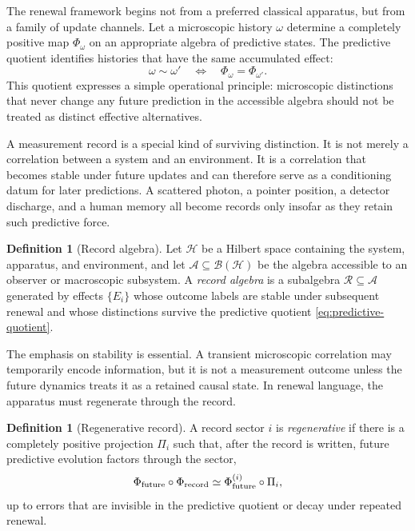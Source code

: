 \documentclass[11pt]{article}
\numberwithin{equation}{section}
\theoremstyle{definition}
\newtheorem{definition}[theorem]{Definition}
\theoremstyle{remark}
\newcommand{\Hilb}{\mathcal H}
\newcommand{\B}{\mathcal B}
\newcommand{\Aalg}{\mathcal A}
\newcommand{\Ralg}{\mathcal R}
\begin{document}
The renewal framework begins not from a preferred classical apparatus, but from a family of update channels.  Let a microscopic history \(\omega\) determine a completely positive map \(\Phi_\omega\) on an appropriate algebra of predictive states.  The predictive quotient identifies histories that have the same accumulated effect:
\begin{equation}
\label{eq:predictive-quotient}
  \omega\sim\omega'
  \quad\Longleftrightarrow\quad
  \Phi_\omega=\Phi_{\omega'} .
\end{equation}
This quotient expresses a simple operational principle: microscopic distinctions that never change any future prediction in the accessible algebra should not be treated as distinct effective alternatives.

A measurement record is a special kind of surviving distinction.  It is not merely a correlation between a system and an environment.  It is a correlation that becomes stable under future updates and can therefore serve as a conditioning datum for later predictions.  A scattered photon, a pointer position, a detector discharge, and a human memory all become records only insofar as they retain such predictive force.

\begin{definition}[Record algebra]
Let \(\Hilb\) be a Hilbert space containing the system, apparatus, and environment, and let \(\Aalg\subseteq\B(\Hilb)\) be the algebra accessible to an observer or macroscopic subsystem.  A \emph{record algebra} is a subalgebra \(\Ralg\subseteq\Aalg\) generated by effects \(\{E_i\}\) whose outcome labels are stable under subsequent renewal and whose distinctions survive the predictive quotient \eqref{eq:predictive-quotient}.
\end{definition}

The emphasis on stability is essential.  A transient microscopic correlation may temporarily encode information, but it is not a measurement outcome unless the future dynamics treats it as a retained causal state.  In renewal language, the apparatus must regenerate through the record.

\begin{definition}[Regenerative record]
A record sector \(i\) is \emph{regenerative} if there is a completely positive projection \(\Pi_i\) such that, after the record is written, future predictive evolution factors through the sector,
\begin{equation}
\label{eq:regenerative-factorization}
  \Phi_{\rm future}\circ\Phi_{\rm record}
  \simeq
  \Phi_{\rm future}^{(i)}\circ\Pi_i,
\end{equation}
up to errors that are invisible in the predictive quotient or decay under repeated renewal.
\end{definition}
\end{document}
